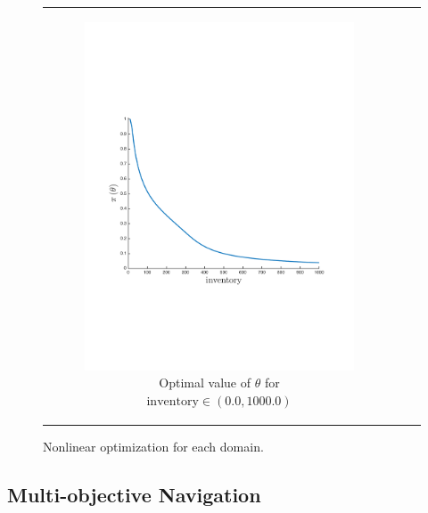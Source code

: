 {\begin{figure}[ht]
\begin{tabular}{ccc}
            \begin{subfigure}{0.33\textwidth}\centering\includegraphics[width=0.9\linewidth, height=0.55\linewidth]{images/oe_opt_new}\caption{Optimal value of {\footnotesize $ \theta $} for {\footnotesize $ \mathrm{inventory} \in \left(0.0, 1000.0 \right) $}}\label{fig:oe_opt}\end{subfigure}\\
        \end{tabular}
        \caption{Nonlinear optimization for each domain.}        
        \label{tab:opt_results}
    \end{figure}
}

\subsection{Multi-objective Navigation}
\label{sec:results_navigation}

